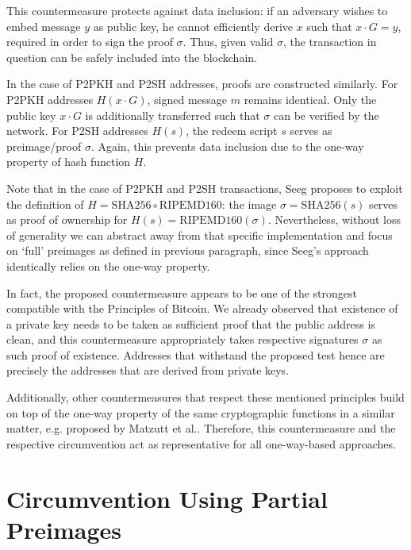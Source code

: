 \documentclass[a4paper,11pt,titlepage]{scrbook}
\begin{document}
This countermeasure protects against data inclusion: if an adversary wishes to embed message $y$ as public key, he cannot efficiently derive $x$ such that $x\cdot G = y$, required in order to sign the proof $\sigma$.
Thus, given valid $\sigma$, the transaction in question can be safely included into the blockchain.

In the case of P2PKH and P2SH addresses, proofs are constructed similarly.
For P2PKH addresses $H(x\cdot G)$, signed message $m$ remains identical.
Only the public key $x\cdot G$ is additionally transferred such that $\sigma$ can be verified by the network.
For P2SH addresses $H(s)$, the redeem script $s$ serves as preimage/proof $\sigma$.
Again, this prevents data inclusion due to the one-way property of hash function $H$.

Note that in the case of P2PKH and P2SH transactions, Seeg proposes to exploit the definition of $H=\mathrm{SHA256}\circ\mathrm{RIPEMD160}$: the image $\sigma = \mathrm{SHA256}(s)$ serves as proof of ownership for $H(s)=\mathrm{RIPEMD160}(\sigma)$.
Nevertheless, without loss of generality we can abstract away from that specific implementation and focus on \enquote*{full} preimages as defined in previous paragraph, since Seeg's approach identically relies on the one-way property.

In fact, the proposed countermeasure appears to be one of the strongest compatible with the Principles of Bitcoin.
We already observed that existence of a private key needs to be taken as sufficient proof that the public address is clean,
and this countermeasure appropriately takes respective signatures $\sigma$ as such proof of existence.
Addresses that withstand the proposed test hence are precisely the addresses that are derived from private keys.

Additionally, other countermeasures that respect these mentioned principles build on top of the one-way property of the same cryptographic functions in a similar matter, e.g.\@ {} proposed by Matzutt et al.\@ \cite[Sec.~IV.D]{matzutt_thwarting_2018}.
Therefore, this countermeasure and the respective circumvention act as representative for all one-way-based approaches.

\section{Circumvention Using Partial Preimages}\label{sec:circumvention}
\end{document}
